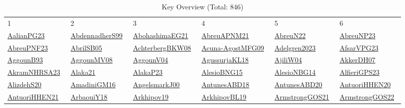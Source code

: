 \begin{longtable}{*{6}{l}}
\rowcolor{white}\caption{Key Overview (Total: 846)}\\ \toprule
\rowcolor{white}1 & 2 & 3 & 4 & 5 & 6\\ \midrule
\endhead
\bottomrule
\endfoot
\href{../works/AalianPG23.pdf}{AalianPG23}~\cite{AalianPG23} & \href{../works/AbdennadherS99.pdf}{AbdennadherS99}~\cite{AbdennadherS99} & \href{../works/AbohashimaEG21.pdf}{AbohashimaEG21}~\cite{AbohashimaEG21} & \href{../works/AbreuAPNM21.pdf}{AbreuAPNM21}~\cite{AbreuAPNM21} & \href{../works/AbreuN22.pdf}{AbreuN22}~\cite{AbreuN22} & \href{../works/AbreuNP23.pdf}{AbreuNP23}~\cite{AbreuNP23}\\ 
\href{../works/AbreuPNF23.pdf}{AbreuPNF23}~\cite{AbreuPNF23} & \href{../works/AbrilSB05.pdf}{AbrilSB05}~\cite{AbrilSB05} & \href{../works/AchterbergBKW08.pdf}{AchterbergBKW08}~\cite{AchterbergBKW08} & \href{../works/Acuna-AgostMFG09.pdf}{Acuna-AgostMFG09}~\cite{Acuna-AgostMFG09} & \href{../works/Adelgren2023.pdf}{Adelgren2023}~\cite{Adelgren2023} & \href{../works/AfsarVPG23.pdf}{AfsarVPG23}~\cite{AfsarVPG23}\\ 
\href{../works/AggounB93.pdf}{AggounB93}~\cite{AggounB93} & \href{../}{AggounMV08}~\cite{AggounMV08} & \href{../}{AggounV04}~\cite{AggounV04} & \href{../works/AgussurjaKL18.pdf}{AgussurjaKL18}~\cite{AgussurjaKL18} & \href{../}{AjiliW04}~\cite{AjiliW04} & \href{../works/AkkerDH07.pdf}{AkkerDH07}~\cite{AkkerDH07}\\ 
\href{../works/AkramNHRSA23.pdf}{AkramNHRSA23}~\cite{AkramNHRSA23} & \href{../}{Alaka21}~\cite{Alaka21} & \href{../}{AlakaP23}~\cite{AlakaP23} & \href{../works/AlesioBNG15.pdf}{AlesioBNG15}~\cite{AlesioBNG15} & \href{../works/AlesioNBG14.pdf}{AlesioNBG14}~\cite{AlesioNBG14} & \href{../works/AlfieriGPS23.pdf}{AlfieriGPS23}~\cite{AlfieriGPS23}\\ 
\href{../}{AlizdehS20}~\cite{AlizdehS20} & \href{../works/AmadiniGM16.pdf}{AmadiniGM16}~\cite{AmadiniGM16} & \href{../works/AngelsmarkJ00.pdf}{AngelsmarkJ00}~\cite{AngelsmarkJ00} & \href{../works/AntunesABD18.pdf}{AntunesABD18}~\cite{AntunesABD18} & \href{../works/AntunesABD20.pdf}{AntunesABD20}~\cite{AntunesABD20} & \href{../works/AntuoriHHEN20.pdf}{AntuoriHHEN20}~\cite{AntuoriHHEN20}\\ 
\href{../works/AntuoriHHEN21.pdf}{AntuoriHHEN21}~\cite{AntuoriHHEN21} & \href{../works/ArbaouiY18.pdf}{ArbaouiY18}~\cite{ArbaouiY18} & \href{../}{Arkhipov19}~\cite{Arkhipov19} & \href{../works/ArkhipovBL19.pdf}{ArkhipovBL19}~\cite{ArkhipovBL19} & \href{../works/ArmstrongGOS21.pdf}{ArmstrongGOS21}~\cite{ArmstrongGOS21} & \href{../works/ArmstrongGOS22.pdf}{ArmstrongGOS22}~\cite{ArmstrongGOS22}\\ 

\end{longtable}
